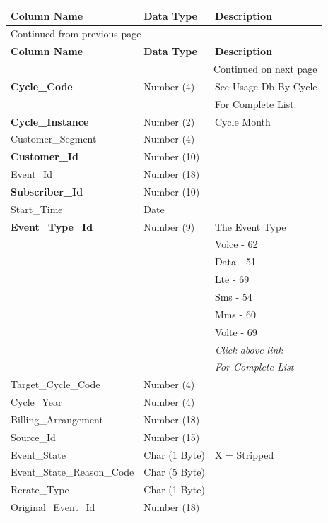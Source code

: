\documentclass[12pt,twoside]{article}
\begin{document}
\begin{longtable}{l|l|l}
\hline
\textbf{Column Name} & \textbf{Data Type} & \textbf{Description}\\
\hline
\endfirsthead
\multicolumn{3}{l}{Continued from previous page} \\
\hline

\textbf{Column Name} & \textbf{Data Type} & \textbf{Description} \\

\hline
\endhead
\hline\multicolumn{3}{r}{Continued on next page} \\
\endfoot
\endlastfoot
\hline
\textbf{Cycle\_Code} & Number (4) & See Usage Db By Cycle\\
 &  & For Complete List.\\
\textbf{Cycle\_Instance} & Number (2) & Cycle Month\\
Customer\_Segment & Number (4) & \\
\textbf{Customer\_Id} & Number (10) & \\
Event\_Id & Number (18) & \\
\textbf{Subscriber\_Id} & Number (10) & \\
Start\_Time & Date & \\
\textbf{Event\_Type\_Id} & Number (9) & \href{https://usc.intranet.teldta.com/sites/is/operations/IS_Billing_Ops/_layouts/15/start.aspx#/oneNoteTest/Turbo\%2520Charge\%2520-\%2520Event\%2520Types.aspx}{The Event Type}\\
 &  & Voice - 62\\
 &  & Data - 51\\
 &  & Lte - 69\\
 &  & Sms - 54\\
 &  & Mms - 60\\
 &  & Volte - 69\\
 &  & \emph{Click above link}\\
 &  & \emph{For Complete List}\\
Target\_Cycle\_Code & Number (4) & \\
Cycle\_Year & Number (4) & \\
Billing\_Arrangement & Number (18) & \\
Source\_Id & Number (15) & \\
Event\_State & Char (1 Byte) & X = Stripped\\
Event\_State\_Reason\_Code & Char (5 Byte) & \\
Rerate\_Type & Char (1 Byte) & \\
Original\_Event\_Id & Number (18) & \\

\end{longtable}
\end{document}
